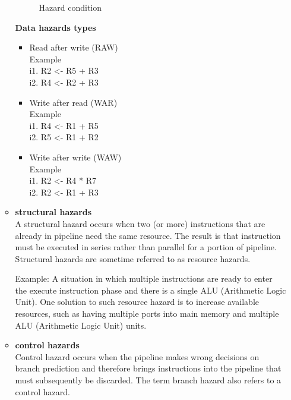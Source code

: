 \documentclass[../main.tex]{subfiles}
\begin{document}
\begin{enumerate}
\begin{itemize}
\begin{figure}[bh]
\caption{Hazard condition}
\label{fig:img}
\end{figure}\cleardoublepage
    
  

\noindent \textbf {Data hazards types}
\begin{itemize}
  \item    {Read after write (RAW)}\\


 {Example}\\
 


i1. R2 \textless-  R5 + R3\\
i2. R4 \textless- R2 + R3\\


\item  {Write after read (WAR)}\\


  {Example}\\


i1. R4 \textless- R1 + R5\\
i2. R5 \textless- R1 + R2\\


\item  {Write after write (WAW)}\\


 {Example}\\


i1. R2 \textless- R4 * R7\\
i2. R2 \textless- R1 + R3\\
\end{itemize}

 
     \item \textbf {structural hazards}\\
     A structural hazard occurs when two (or more) instructions that are already in pipeline need the same resource. The result is that instruction must be executed in series rather than parallel for a portion of pipeline. Structural hazards are sometime referred to as resource hazards.

Example: A situation in which multiple instructions are ready to enter the execute instruction phase and there is a single ALU (Arithmetic Logic Unit). One solution to such resource hazard is to increase available resources, such as having multiple ports into main memory and multiple ALU (Arithmetic Logic Unit) units.
     \item \textbf {control hazards}\\
     Control hazard occurs when the pipeline makes wrong decisions on branch prediction and therefore brings instructions into the pipeline that must subsequently be discarded. The term branch hazard also refers to a control hazard.
\end{itemize}


\end{enumerate}
\end{document}
